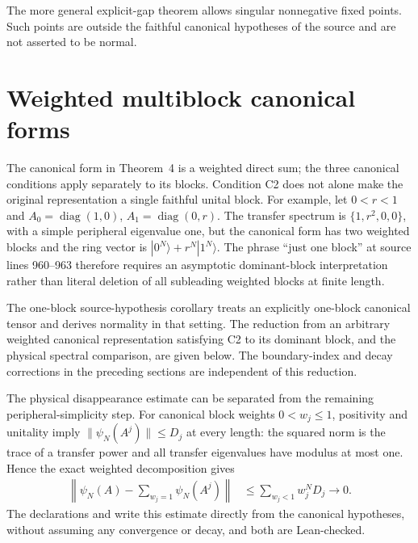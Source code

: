 \documentclass{article}
\begin{document}
The more general explicit-gap theorem allows singular nonnegative fixed
points. Such points are outside the faithful canonical hypotheses of the
source and are not asserted to be normal.

\section{Weighted multiblock canonical forms}
The canonical form in Theorem~4 is a weighted direct sum; the three
canonical conditions apply separately to its blocks. Condition C2 does
not alone make the original representation a single faithful unital block.
For example, let $0<r<1$ and
$A_0=\operatorname{diag}(1,0)$, $A_1=\operatorname{diag}(0,r)$.
The transfer spectrum is $\{1,r^2,0,0\}$, with a simple peripheral
eigenvalue one, but the canonical form has two weighted blocks and the
ring vector is $|0^N\rangle+r^N|1^N\rangle$.
The phrase ``just one block'' at source lines 960--963 therefore requires
an asymptotic dominant-block interpretation rather than literal deletion
of all subleading weighted blocks at finite length.

The one-block source-hypothesis corollary treats an explicitly one-block
canonical tensor and derives normality in that setting. The reduction from
an arbitrary weighted canonical representation satisfying C2 to its
dominant block, and the physical spectral comparison, are given below.
The boundary-index and decay corrections in the preceding sections are
independent of this reduction.

The physical disappearance estimate can be separated from the remaining
peripheral-simplicity step. For canonical block weights $0<w_j\leq1$,
positivity and unitality imply $\|\psi_N(A^j)\|\leq D_j$ at every length:
the squared norm is the trace of a transfer power and all transfer
eigenvalues have modulus at most one. Hence the exact weighted decomposition
gives
\begin{align}
    \left\|\psi_N(A)-\sum_{w_j=1}\psi_N(A^j)\right\|
     & \leq\sum_{w_j<1}w_j^ND_j\longrightarrow0.
    \label{eq:pgvwc07_weighted_remainder_estimate}
\end{align}
The declarations
 and
write this estimate directly from the canonical hypotheses, without
assuming any convergence or decay, and both are Lean-checked.
\end{document}
